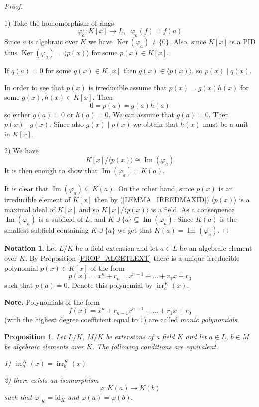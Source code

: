 \documentclass[12pt, letterpaper, oneside]{article}
\theoremstyle{plain}
\newtheorem{proposition}[theorem]{Proposition}
\theoremstyle{definition}
\newtheorem{notation}[theorem]{Notation}
\newcommand{\id}{\mathrm{id}}
\renewcommand{\Im}{\operatorname{Im}}
\newcommand{\Ker}{\operatorname{Ker}}
\newcommand{\subgp}[1]{\langle#1\rangle}
\newcommand{\irr}{\operatorname{irr}}
\newcommand{\vs}{\vskip 5mm}
\begin{document}
\vs

\begin{proof} \ 

1) Take the  homomorphism of rings
$$\varphi_{a}\colon K[x] \to L, \ \ \ \varphi_{a}(f) = f(a)$$
Since $a$ is algebraic over $K$ we have $\Ker({\varphi_{a}})\neq \{0\}$. 
Also, since $K[x]$ is a PID thus $\Ker({\varphi_{a}}) = \subgp{p(x)}$ for some 
$p(x)\in K[x]$. 

If $q(a) = 0$ for some $q(x)\in K[x]$ then $q(x)\in \subgp{p(x)}$,  so $p(x) \mid q(x)$.

In order to see that $p(x)$ is irreducible assume that $p(x) = g(x)h(x)$ for some $g(x), h(x)\in K[x]$. 
Then
$$0 = p(a)= g(a)h(a)$$
so either $g(a)=0$ or $h(a)=0$. We can assume that $g(a) = 0$. Then $p(x) \mid g(x)$. Since also 
$g(x) \mid p(x)$ we obtain that $h(x)$ must be a unit in $K[x]$. 


\vs

2) We have 
$$K[x]/\subgp{p(x)} \cong \Im(\varphi_{a})$$
It is then enough to show that $\Im(\varphi_{a}) = K(a)$. 

It is clear that  $\Im(\varphi_{a})\subseteq K(a)$. 
On the other hand, since $p(x)$ is an irreducible element of $K[x]$ then by (\ref{LEMMA_IRREDMAXID})
$\subgp{p(x)}$ is a maximal ideal of $K[x]$ and so $K[x]/\subgp{p(x)}$ is a field. As a consequence 
$\Im(\varphi_{a})$ is a subfield of $L$, and $K\cup \{a\}\subseteq \Im(\varphi_{a})$. Since $K(a)$
is the smallest subfield containing $K\cup \{a\}$ we get that $K(a) = \Im(\varphi_{a})$.
\end{proof}



\vs\vs

\begin{notation}
Let $L/K$ be a field extension and let $a\in L$ be an algebraic element over $K$. By 
Proposition \ref{PROP_ALGETLEXT} there is a unique irreducible polynomial $p(x)\in K[x]$
of the form 
$$p(x) = x^{n} + r_{n-1}x^{n-1} + {\dots} + r_{1}x + r_{0}$$
such that $p(a) = 0$. Denote this polynomial by $\irr^{K}_{a}(x)$.
\end{notation}

\vs\vs

\textbf{Note.} Polynomials of the form 
$$f(x) =  x^{n} + r_{n-1}x^{n-1} + {\dots} + r_{1}x + r_{0}$$
(with the highest degree coefficient equal to $1$) are called \emph{monic polynomials}.



\vs\vs

\begin{proposition}
\label{PROP_EQUIVALGEXT}
Let $L/K$, $M/K$ be extensions of a field $K$ and let $a\in L$, $b\in M$ be algebraic elements 
over $K$. The following conditions are equivalent. 

1) $\irr^{K}_{a}(x) = \irr^{K}_{b}(x)$

2) there exists an isomorphism 
$$\varphi\colon K(a) \to K(b)$$
such that $\varphi|_{K} = \id_{K}$ and $\varphi(a) = \varphi(b)$.

\end{proposition}
\end{document}
